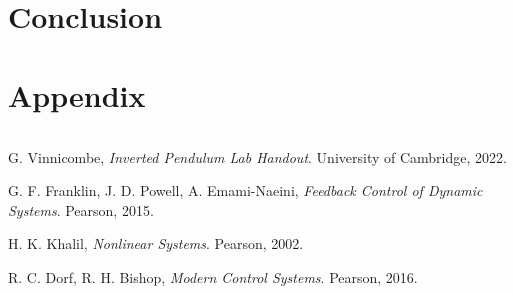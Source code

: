 \documentclass{article}
\begin{document}
\section{Conclusion}


\newpage
\section{Appendix}

\begin {lstlisting}[language=Python]

\end{lstlisting}


\newpage
\begin{thebibliography}{9}

  G. Vinnicombe,
  \emph{Inverted Pendulum Lab Handout}.
  University of Cambridge,
  2022.

  G. F. Franklin, J. D. Powell, A. Emami-Naeini,
  \emph{Feedback Control of Dynamic Systems}.
  Pearson,
  2015.

  H. K. Khalil,
  \emph{Nonlinear Systems}.
  Pearson,
  2002.

  R. C. Dorf, R. H. Bishop,
  \emph{Modern Control Systems}.
  Pearson,
  2016.

\end{thebibliography}
\end{document}
